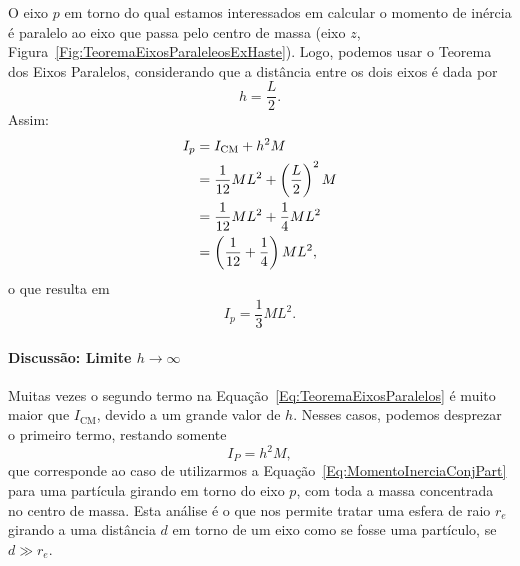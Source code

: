 O eixo $p$ em torno do qual estamos interessados em calcular o momento de inércia é paralelo ao eixo que passa pelo centro de massa (eixo $z$, Figura~\ref{Fig:TeoremaEixosParaleleosExHaste}). Logo, podemos usar o Teorema dos Eixos Paralelos, considerando que a distância entre os dois eixos é dada por
\begin{equation}
    h = \frac{L}{2}.
\end{equation}
%
Assim:
\begin{align}
    I_p &= I_{\rm{CM}} + h^2 M \\
    &= \frac{1}{12} ML^2 + \left(\frac{L}{2}\right)^2 M \\
    &= \frac{1}{12} ML^2 + \frac{1}{4} ML^2 \\
    &= \left(\frac{1}{12} + \frac{1}{4}\right) ML^2,
\end{align}
%
o que resulta em 
\begin{equation}
    I_p = \frac{1}{3} ML^2.
\end{equation}

\paragraph{Discussão: Limite $h \to \infty$}

Muitas vezes o segundo termo na Equação~\eqref{Eq:TeoremaEixosParalelos} é muito maior que $I_{\textrm{CM}}$, devido a um grande valor de $h$. Nesses casos, podemos desprezar o primeiro termo, restando somente
\begin{equation}
  I_P = h^2 M,
\end{equation}
%
que corresponde ao caso de utilizarmos a Equação~\eqref{Eq:MomentoInerciaConjPart} para uma partícula girando em torno do eixo $p$, com toda a massa concentrada no centro de massa. Esta análise é o que nos permite tratar uma esfera de raio $r_e$ girando a uma distância $d$ em torno de um eixo como se fosse uma partículo, se $d \gg r_e$.

